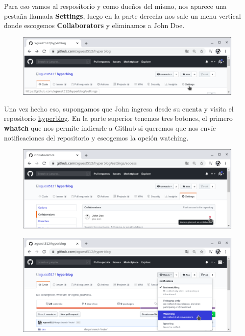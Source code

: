 \documentclass{article}
\begin{document}
Para eso vamos al respositorio y como dueños del mismo, nos aparece una pestaña
llamada \textbf{Settings}, luego en la parte derecha nos sale un menu vertical
donde escogemos \textbf{Collaborators} y eliminamos a John Doe.

\begin{figure}[h!]
  \centering
  \includegraphics[scale=0.75]{./Pictures/304_settings.png}
\end{figure}

Una vez hecho eso, supongamos que John ingresa desde su cuenta y visita el
repositorio \href{https://github.com/xguest512/hyperblog}{hyperblog}. En la
parte superior tenemos tres botones, el primero \textbf{whatch} que nos permite
indicarle a Github si queremos que nos envíe notificaciones del repositorio y
escogemos la opción watching.

\begin{figure}[h!]
  \centering
  \includegraphics[scale=0.75]{./Pictures/305_remove_john.png}
\end{figure}

\begin{figure}[h!]
  \centering
  \includegraphics[scale=0.75]{./Pictures/306_watching.png}
\end{figure}
\end{document}
